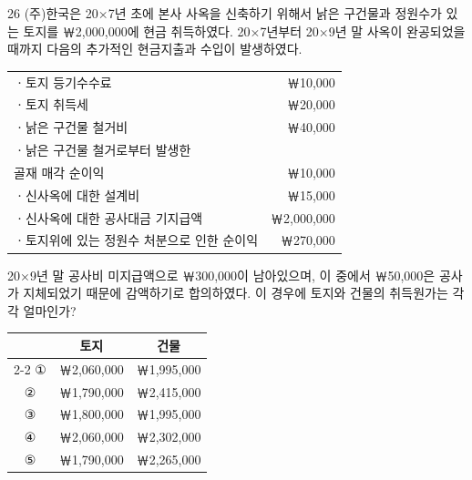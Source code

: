 \begin{question}{26}
(주)한국은 20×7년 초에 본사 사옥을 신축하기 위해서 낡은 구건물과 정원수가 있는 토지를 ￦2,000,000에 현금 취득하였다. 20×7년부터 20×9년 말 사옥이 완공되었을 때까지 다음의 추가적인 현금지출과 수입이 발생하였다.

{\small\centering
\begin{tabular}{@{}l r@{}}
\hline
ㆍ토지 등기수수료 & ￦10,000 \\
ㆍ토지 취득세 & ￦20,000 \\
ㆍ낡은 구건물 철거비 & ￦40,000 \\
ㆍ낡은 구건물 철거로부터 발생한 & \\
\hspace{0.7em}골재 매각 순이익 & ￦10,000 \\
ㆍ신사옥에 대한 설계비 & ￦15,000 \\
ㆍ신사옥에 대한 공사대금 기지급액 & ￦2,000,000 \\
ㆍ토지위에 있는 정원수 처분으로 인한 순이익 & ￦270,000 \\
\hline
\end{tabular}\par}
20×9년 말 공사비 미지급액으로 ￦300,000이 남아있으며, 이 중에서 ￦50,000은 공사가 지체되었기 때문에 감액하기로 합의하였다. 이 경우에 토지와 건물의 취득원가는 각각 얼마인가? \par

{\small\centering
\begin{tabular}{@{}ccc@{}}
 & 토지 & 건물 \\
\cline{2-2}\cline{3-3}
① & ￦2,060,000 & ￦1,995,000 \\
② & ￦1,790,000 & ￦2,415,000 \\
③ & ￦1,800,000 & ￦1,995,000 \\
④ & ￦2,060,000 & ￦2,302,000 \\
⑤ & ￦1,790,000 & ￦2,265,000 \\
\end{tabular}\par}
\end{question}
